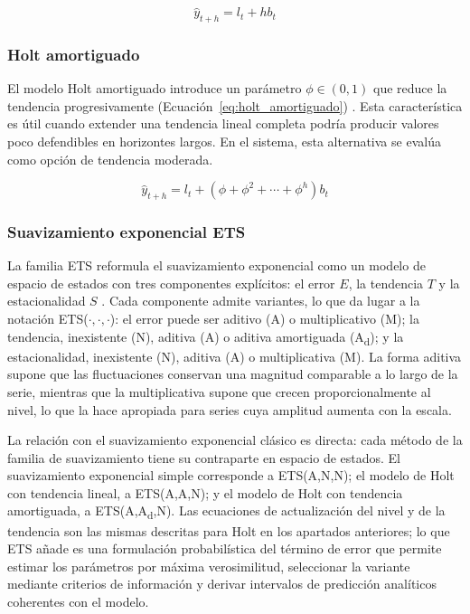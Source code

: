 \documentclass[12pt,letterpaper]{article}
\providecommand{\parencite}{\citep}
\begin{document}
\begin{equation}
\hat{y}_{t+h}=l_t+hb_t
\label{eq:holt}
\end{equation}

\subsubsection{Holt amortiguado}

El modelo Holt amortiguado introduce un parámetro $\phi\in(0,1)$ que reduce la tendencia progresivamente (Ecuación~\ref{eq:holt_amortiguado}) \parencite{gardner_mckenzie1985}. Esta característica es útil cuando extender una tendencia lineal completa podría producir valores poco defendibles en horizontes largos. En el sistema, esta alternativa se evalúa como opción de tendencia moderada.

\begin{equation}
\hat{y}_{t+h}=l_t+(\phi+\phi^2+\cdots+\phi^h)b_t
\label{eq:holt_amortiguado}
\end{equation}

\subsubsection{Suavizamiento exponencial ETS}
\label{sec:teoria_ets}

La familia ETS reformula el suavizamiento exponencial como un modelo de espacio de estados con tres componentes explícitos: el error \(E\), la tendencia \(T\) y la estacionalidad \(S\) \parencite{hyndman2021fpp3}. Cada componente admite variantes, lo que da lugar a la notación ETS(\(\cdot,\cdot,\cdot\)): el error puede ser aditivo (A) o multiplicativo (M); la tendencia, inexistente (N), aditiva (A) o aditiva amortiguada (A\textsubscript{d}); y la estacionalidad, inexistente (N), aditiva (A) o multiplicativa (M). La forma aditiva supone que las fluctuaciones conservan una magnitud comparable a lo largo de la serie, mientras que la multiplicativa supone que crecen proporcionalmente al nivel, lo que la hace apropiada para series cuya amplitud aumenta con la escala.

La relación con el suavizamiento exponencial clásico es directa: cada método de la familia de suavizamiento tiene su contraparte en espacio de estados. El suavizamiento exponencial simple corresponde a ETS(A,N,N); el modelo de Holt con tendencia lineal, a ETS(A,A,N); y el modelo de Holt con tendencia amortiguada, a ETS(A,A\textsubscript{d},N). Las ecuaciones de actualización del nivel y de la tendencia son las mismas descritas para Holt en los apartados anteriores; lo que ETS añade es una formulación probabilística del término de error que permite estimar los parámetros por máxima verosimilitud, seleccionar la variante mediante criterios de información y derivar intervalos de predicción analíticos coherentes con el modelo.
\end{document}
